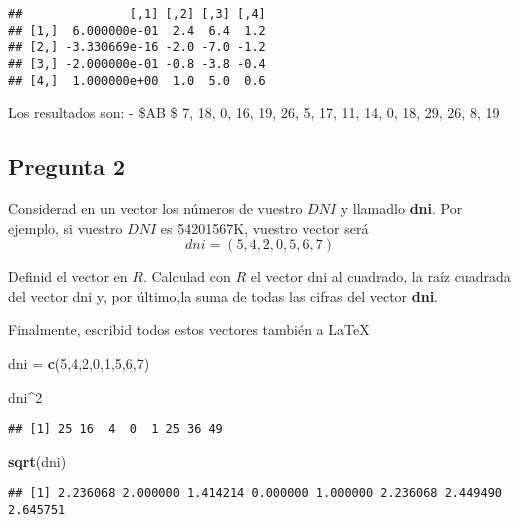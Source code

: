 \documentclass[
]{article}
\newenvironment{Shaded}{\begin{snugshade}}{\end{snugshade}}
\newcommand{\DecValTok}[1]{\textcolor[rgb]{0.00,0.00,0.81}{#1}}
\newcommand{\KeywordTok}[1]{\textcolor[rgb]{0.13,0.29,0.53}{\textbf{#1}}}
\newcommand{\NormalTok}[1]{#1}
\newcommand{\OperatorTok}[1]{\textcolor[rgb]{0.81,0.36,0.00}{\textbf{#1}}}
\newcommand{\StringTok}[1]{\textcolor[rgb]{0.31,0.60,0.02}{#1}}
\begin{document}
\begin{verbatim}
##               [,1] [,2] [,3] [,4]
## [1,]  6.000000e-01  2.4  6.4  1.2
## [2,] -3.330669e-16 -2.0 -7.0 -1.2
## [3,] -2.000000e-01 -0.8 -3.8 -0.4
## [4,]  1.000000e+00  1.0  5.0  0.6
\end{verbatim}

Los resultados son: - \$A\cdot B \$ 7, 18, 0, 16, 19, 26, 5, 17, 11, 14,
0, 18, 29, 26, 8, 19

\hypertarget{pregunta-2}{%
\subsection{Pregunta 2}\label{pregunta-2}}

Considerad en un vector los números de vuestro \(DNI\) y llamadlo
\textbf{dni}. Por ejemplo, si vuestro \(DNI\) es 54201567K, vuestro
vector será \[dni = (5,4,2,0,5,6,7)\]

Definid el vector en \(R\). Calculad con \(R\) el vector dni al
cuadrado, la raíz cuadrada del vector dni y, por último,la suma de todas
las cifras del vector \textbf{dni}.

Finalmente, escribid todos estos vectores también a \LaTeX

\begin{Shaded}
\begin{Highlighting}[]
\NormalTok{dni =}\StringTok{ }\KeywordTok{c}\NormalTok{(}\DecValTok{5}\NormalTok{,}\DecValTok{4}\NormalTok{,}\DecValTok{2}\NormalTok{,}\DecValTok{0}\NormalTok{,}\DecValTok{1}\NormalTok{,}\DecValTok{5}\NormalTok{,}\DecValTok{6}\NormalTok{,}\DecValTok{7}\NormalTok{)}

\NormalTok{dni}\OperatorTok{^}\DecValTok{2}
\end{Highlighting}
\end{Shaded}

\begin{verbatim}
## [1] 25 16  4  0  1 25 36 49
\end{verbatim}

\begin{Shaded}
\begin{Highlighting}[]
\KeywordTok{sqrt}\NormalTok{(dni)}
\end{Highlighting}
\end{Shaded}

\begin{verbatim}
## [1] 2.236068 2.000000 1.414214 0.000000 1.000000 2.236068 2.449490 2.645751
\end{verbatim}
\end{document}
